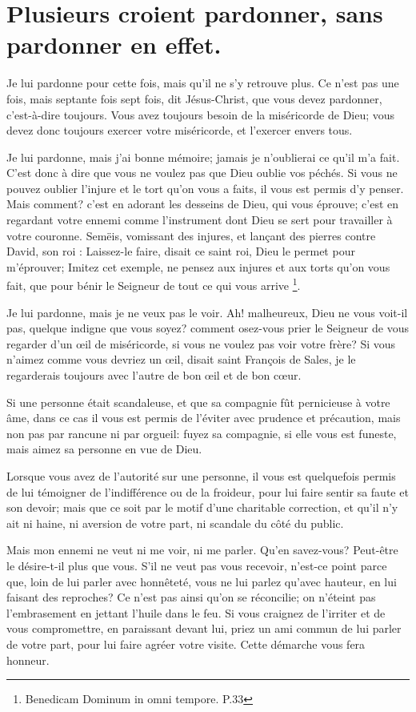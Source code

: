 \documentclass[instructions.tex]{subfiles}
\begin{document}
 
\chapter{Plusieurs croient pardonner, sans pardonner en effet.}
 
\primo Je lui pardonne pour cette fois, mais qu’il ne s’y retrouve plus. Ce n’est pas une fois, mais septante fois sept fois, dit Jésus-Christ, que vous devez pardonner, c’est-à-dire toujours. Vous avez toujours besoin de la miséricorde de Dieu; vous devez donc toujours exercer votre miséricorde, et l’exercer envers tous.

\secundo Je lui pardonne, mais j’ai bonne mémoire; jamais je n’oublierai ce qu’il m’a fait. C’est donc à dire que vous ne voulez pas que Dieu oublie vos péchés. Si vous ne pouvez oublier l’injure et le tort qu’on vous a faits, il vous est permis d’y penser. Mais comment? c’est en adorant les desseins de Dieu, qui vous éprouve; c’est en regardant votre ennemi comme l’instrument dont Dieu se sert pour travailler à votre couronne. Semëis, vomissant des injures, et lançant des pierres contre David, son roi : Laissez-le faire, disait ce saint roi, Dieu le permet pour m’éprouver; Imitez cet exemple, ne pensez aux injures et aux torts qu’on vous fait, que pour bénir le Seigneur de tout ce qui vous arrive \footnote{Benedicam Dominum in omni tempore. P.33}.

\tertio Je lui pardonne, mais je ne veux pas le voir. Ah! malheureux, Dieu ne vous voit-il pas, quelque indigne que vous soyez? comment osez-vous prier le Seigneur de vous regarder d’un œil de miséricorde, si vous ne voulez pas voir votre frère? Si vous n’aimez comme vous devriez un œil, disait saint François de Sales, je le regarderais toujours avec l’autre de bon œil et de bon cœur.

Si une personne était scandaleuse, et que sa compagnie fût pernicieuse à votre âme, dans ce cas il vous est permis de l’éviter avec prudence et précaution, mais non pas par rancune ni par orgueil: fuyez sa compagnie, si elle vous est funeste, mais aimez sa personne en vue de Dieu.

Lorsque vous avez de l’autorité sur une personne, il vous est quelquefois permis de lui témoigner de l’indifférence ou de la froideur, pour lui faire sentir sa faute et son devoir; mais que ce soit par le motif d’une charitable correction, et qu’il n’y ait ni haine, ni aversion de votre part, ni scandale du côté du public.

\quarto Mais mon ennemi ne veut ni me voir, ni me parler. Qu’en savez-vous? Peut-être le désire-t-il plus que vous. S’il ne veut pas vous recevoir, n’est-ce point parce que, loin de lui parler avec honnêteté, vous ne lui parlez qu’avec hauteur, en lui faisant des reproches? Ce n’est pas ainsi qu’on se réconcilie; on n’éteint pas l’embrasement en jettant l’huile dans le feu. Si vous craignez de l’irriter et de vous compromettre, en paraissant devant lui, priez un ami commun de lui parler de votre part, pour lui faire agréer votre visite. Cette démarche vous fera honneur.
\end{document}
